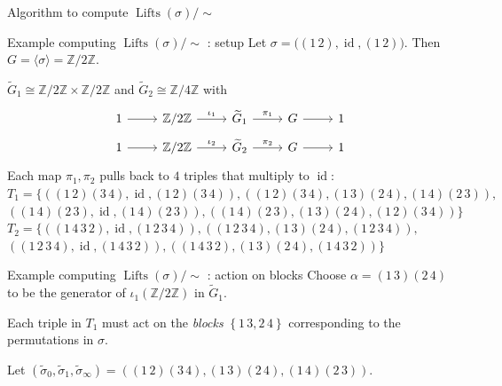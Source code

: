 \documentclass[xcolor=dvipsnames]{beamer}
\theoremstyle{plain}
\newcommand{\ZZ}{\mathbb Z}
\newcommand{\wt}[1]{\widetilde{#1}}
\DeclareMathOperator{\Lifts}{Lifts}
\DeclareMathOperator{\id}{id}
\begin{document}
{\begin{frame}[fragile]{Algorithm to compute $\Lifts(\sigma)/\!\!\sim$}
\begin{enumerate}
      \end{enumerate}
    \end{frame}
    \begin{frame}[fragile]{Example computing $\Lifts(\sigma)/\!\!\sim$ : setup}
      Let $\sigma = \big((1\,2),\id,(1\,2)\big)$.
      Then $G = \langle\sigma\rangle = \ZZ/2\ZZ$.
      \pause\par
      $\wt{G}_1\cong\ZZ/2\ZZ\times\ZZ/2\ZZ$
      and
      $\wt{G}_2\cong\ZZ/4\ZZ$ with
      \begin{align*}
        \begin{tikzcd}[ampersand replacement=\&, row sep = small]
          1\arrow{r}\&\ZZ/2\ZZ\arrow{r}{\iota_1}\&\wt{G}_1\arrow{r}{\pi_1}\&G\arrow{r}\&1
        \end{tikzcd}
        \\
        \begin{tikzcd}[ampersand replacement=\&, row sep = small]
          1\arrow{r}\&\ZZ/2\ZZ\arrow{r}{\iota_2}\&\wt{G}_2\arrow{r}{\pi_2}\&G\arrow{r}\&1
        \end{tikzcd}
      \end{align*}
      \pause
      Each map $\pi_1,\pi_2$ pulls back to
      $4$ triples that multiply to $\id$:
      \pause
      $T_1=
      \Big\{((1\,2)(3\,4), \id, (1\,2)(3\,4)),
      ((1\,2)(3\,4), (1\,3)(2\,4), (1\,4)(2\,3)),$
      $((1\,4)(2\,3), \id, (1\,4)(2\,3)),
      ((1\,4)(2\,3), (1\,3)(2\,4), (1\,2)(3\,4))
      \Big\}$
      \pause
      $T_2=
      \Big\{
      ((1\,4\,3\,2), \id, (1\,2\,3\,4)),
      ((1\,2\,3\,4), (1\,3)(2\,4), (1\,2\,3\,4)),$
      $((1\,2\,3\,4), \id, (1\,4\,3\,2)),
      ((1\,4\,3\,2), (1\,3)(2\,4), (1\,4\,3\,2))
      \Big\}$
    \end{frame}
    \begin{frame}{Example computing $\Lifts(\sigma)/\!\!\sim$ : action on blocks}
      Choose $\alpha=(1\,3)(2\,4)$ to be
      the generator of $\iota_1(\ZZ/2\ZZ)$
      in $\wt{G}_1$.
      \pause\par
      Each triple in
      $T_1$ must act on the
      \emph{blocks}
      $\left\{\boxed{1\,3},\boxed{2\,4}\right\}$
      corresponding to the permutations in
      $\sigma$.
      \pause\par
      Let
      $(\wt{\sigma}_0,\wt{\sigma}_1,\wt{\sigma}_\infty)=
      ((1\,2)(3\,4), (1\,3)(2\,4), (1\,4)(2\,3))$.
      \pause\par

\end{frame}}
\end{document}
